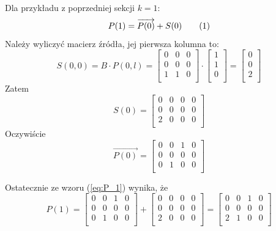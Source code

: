 \documentclass[12pt]{book}
\newcommand\addtag{\refstepcounter{equation}
\tag{\theequation}}
\begin{document}
Dla przykładu z poprzedniej sekcji $k=1$:
\[P(1)=\overrightarrow{P(0)}+S(0) \addtag \label{eq:P_1} \]
Należy wyliczyć macierz źródła, jej pierwsza kolumna to:
\[S(0,0)=B\cdot P(0,l)=
  \begin{bmatrix}
   0 & 0 & 0\\
   0 & 0 & 0\\
   1 & 1 & 0\\
   \end{bmatrix}
   \cdot
   \begin{bmatrix}
   1\\
   1\\
   0\\
   \end{bmatrix}
   =
      \begin{bmatrix}
   0\\
   0\\
   2\\
   \end{bmatrix}
 \]
 Zatem 
 \[S(0)=\begin{bmatrix}
 0 & 0 & 0 & 0\\
 0 & 0 & 0 & 0\\
 2 & 0 & 0 & 0\\
 \end{bmatrix}\]
 Oczywiście
 \[ \overrightarrow{P(0)}=
\begin{bmatrix}
 0 & 0 & 1 & 0\\
 0 & 0 & 0 & 0\\
 0 & 1 & 0 & 0\\
 \end{bmatrix} 
 \]
  
Ostatecznie ze wzoru (\ref{eq:P_1}) wynika, że
 \[P(1)=\begin{bmatrix}
 0 & 0 & 1 & 0\\
 0 & 0 & 0 & 0\\
 0 & 1 & 0 & 0\\
 \end{bmatrix}+
 \begin{bmatrix}
 0 & 0 & 0 & 0\\
 0 & 0 & 0 & 0\\
 2 & 0 & 0 & 0\\
 \end{bmatrix}=
  \begin{bmatrix}
 0 & 0 & 1 & 0\\
 0 & 0 & 0 & 0\\
 2 & 1 & 0 & 0\\
 \end{bmatrix}
 \]
\end{document}
